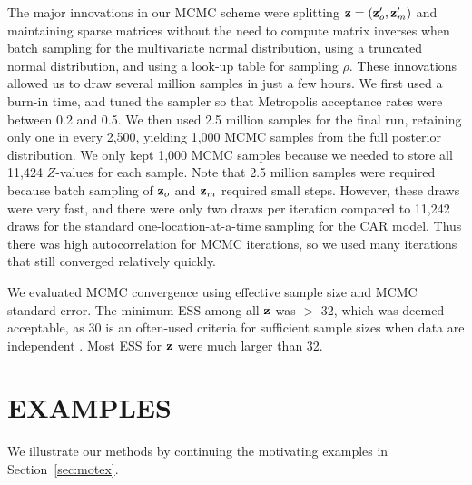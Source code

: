 \documentclass[11pt, titlepage]{article}
\begin{document}
\begin{spacing}{1.9}
\begin{flushleft}
The major innovations in our MCMC scheme were splitting $\mathbf{z} = (\mathbf{z}_{o}^{\prime},\mathbf{z}_{m}^{\prime})$ and maintaining sparse matrices without the need to compute matrix inverses when batch sampling for the multivariate normal distribution, using a truncated normal distribution, and using a look-up table for sampling $\rho$.  These innovations allowed us to draw several million samples in just a few hours.  We first used a burn-in time, and tuned the sampler so that Metropolis acceptance rates were between 0.2 and 0.5.  We then used 2.5 million samples for the final run, retaining only one in every 2,500, yielding 1,000 MCMC samples from the full posterior distribution.  We only kept 1,000 MCMC samples because we needed to store all 11,424 $Z$-values for each sample.  Note that 2.5 million samples were required because batch sampling of $\mathbf{z}_{o}$ and $\mathbf{z}_{m}$ required small steps. However, these draws were very fast, and there were only two draws per iteration compared to 11,242 draws for the standard one-location-at-a-time sampling for the CAR model.  Thus there was high autocorrelation for MCMC iterations, so we used many iterations that still converged relatively quickly.

We evaluated MCMC convergence using effective sample size \citep[ESS,][]{flegal_markov_2008, gong_practical_2016} and MCMC standard error.  The minimum ESS among all $\mathbf{z}$ was $>$ 32, which was deemed acceptable, as 30 is an often-used criteria for sufficient sample sizes when data are independent \citep[likely originating in][]{student_probable_1908}.  Most ESS for $\mathbf{z}$ were much larger than 32.


\section{EXAMPLES}

We illustrate our methods by continuing the motivating examples in Section~\ref{sec:motex}.



\end{flushleft}
\end{spacing}
\end{document}
